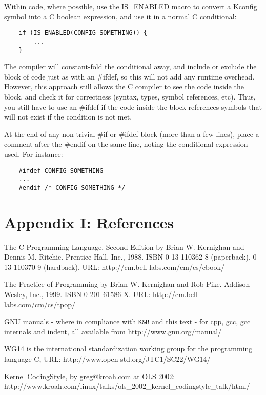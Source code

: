 \documentclass[pdftex,12pt, twocol]{article} %
\begin{document}
Within code, where possible, use the IS\_ENABLED macro to convert a Kconfig
symbol into a C boolean expression, and use it in a normal C conditional:

\begin{verbatim}
	if (IS_ENABLED(CONFIG_SOMETHING)) {
		...
	}
\end{verbatim}

The compiler will constant-fold the conditional away, and include or exclude
the block of code just as with an \#ifdef, so this will not add any runtime
overhead.  However, this approach still allows the C compiler to see the code
inside the block, and check it for correctness (syntax, types, symbol
references, etc).  Thus, you still have to use an \#ifdef if the code inside the
block references symbols that will not exist if the condition is not met.

At the end of any non-trivial \#if or \#ifdef block (more than a few lines),
place a comment after the \#endif on the same line, noting the conditional
expression used.  For instance:

\begin{verbatim}
	#ifdef CONFIG_SOMETHING
	...
	#endif /* CONFIG_SOMETHING */
\end{verbatim}


\section*{Appendix I: References}
The C Programming Language, Second Edition
by Brian W. Kernighan and Dennis M. Ritchie.
Prentice Hall, Inc., 1988.
ISBN 0-13-110362-8 (paperback), 0-13-110370-9 (hardback).
URL: http://cm.bell-labs.com/cm/cs/cbook/

The Practice of Programming
by Brian W. Kernighan and Rob Pike.
Addison-Wesley, Inc., 1999.
ISBN 0-201-61586-X.
URL: http://cm.bell-labs.com/cm/cs/tpop/

GNU manuals - where in compliance with \verb+K&R+ and this text - for cpp, gcc,
gcc internals and indent, all available from http://www.gnu.org/manual/

WG14 is the international standardization working group for the programming
language C, URL: http://www.open-std.org/JTC1/SC22/WG14/

Kernel CodingStyle, by greg@kroah.com at OLS 2002:
http://www.kroah.com/linux/talks/ols\_2002\_kernel\_codingstyle\_talk/html/
\end{document}
